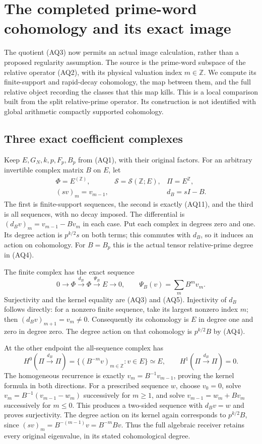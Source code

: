 \section{The completed prime-word cohomology and its exact image}
\label{sec:completed-prime-word}
The quotient (AQ3) now permits an actual image calculation, rather
than a proposed regularity assumption. The source is the prime-word
subspace of the relative operator (AQ2), with its physical valuation
index $m\in\mathbb Z$. We compute its finite-support and rapid-decay
cohomology, the map between them, and the full relative object
recording the classes that this map kills. This is a local comparison
built from the split relative-prime operator. Its construction is not
identified with global arithmetic compactly supported cohomology.

\subsection{Three exact coefficient complexes}
Keep $E,G_N,k,p,F_p,B_p$ from (AQ1), with their original factors.
For an arbitrary invertible complex matrix $B$ on $E$, let
\[
 \begin{array}{lll}
 \Phi=E^{(\mathbb Z)},&
 \mathscr S=\mathscr S(\mathbb Z;E),&
 \Pi=E^{\mathbb Z},\\
 (sv)_m=v_{m-1},&& d_B=sI-B.
 \end{array}
 \tag{PC1}
\]
The first is finite-support sequences, the second is exactly (AQ11),
and the third is all sequences, with no decay imposed. The differential
is $(d_Bv)_m=v_{m-1}-Bv_m$ in each case. Put each complex in degrees
zero and one. Its degree action is $p^{k/2}s$ on both terms; this
commutes with $d_B$, so it induces an action on cohomology. For $B=B_p$
this is the actual tensor relative-prime degree in (AQ4).

The finite complex has the exact sequence
\[
 0\longrightarrow\Phi\xrightarrow{d_B}\Phi
 \xrightarrow{\Psi_B}E\longrightarrow0,
 \qquad \Psi_B(v)=\sum_mB^mv_m.
 \tag{PC2}
\]
Surjectivity and the kernel equality are (AQ3) and (AQ5). Injectivity
of $d_B$ follows directly: for a nonzero finite sequence, take its
largest nonzero index $m$; then $(d_Bv)_{m+1}=v_m\ne0$.
Consequently its cohomology is $E$ in degree one and zero in degree
zero. The degree action on that cohomology is $p^{k/2}B$ by (AQ4).

At the other endpoint the all-sequence complex has
\[
 H^0(\Pi\xrightarrow{d_B}\Pi)
   =\{(B^{-m}v)_{m\in\mathbb Z}:v\in E\}\simeq E,
 \qquad H^1(\Pi\xrightarrow{d_B}\Pi)=0.
 \tag{PC3}
\]
The homogeneous recurrence is exactly $v_m=B^{-1}v_{m-1}$, proving
the kernel formula in both directions. For a prescribed sequence
$w$, choose $v_0=0$, solve
$v_m=B^{-1}(v_{m-1}-w_m)$ successively for $m\ge1$, and solve
$v_{m-1}=w_m+Bv_m$ successively for $m\le0$. This produces a
two-sided sequence with $d_Bv=w$ and proves surjectivity. The degree
action on its kernel again corresponds to $p^{k/2}B$, since
$(sv)_m=B^{-(m-1)}v=B^{-m}Bv$. Thus the full algebraic receiver
retains every original eigenvalue, in its stated cohomological degree.

